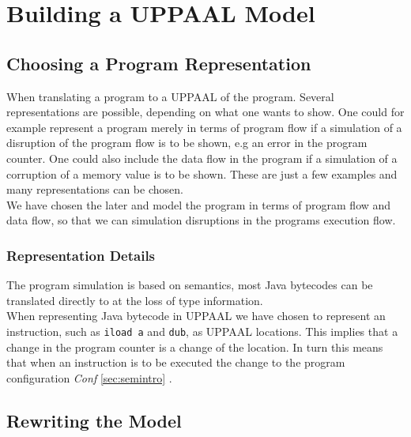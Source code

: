 \chapter{Building a UPPAAL Model}
\section{Choosing a Program Representation}
When translating a program to a UPPAAL of the program. Several representations are possible, depending on what one wants to show. One could for example represent a program merely in terms of program flow if a simulation of a disruption of the program flow is to be shown, e.g an error in the program counter. One could also include the data flow in the program if a simulation of a corruption of a memory value is to be shown. These are just a few examples and many representations can be chosen.\\

We have chosen the later and model the program in terms of program flow and data flow, so that we can simulation disruptions in the programs execution flow. 


\subsection{Representation Details}
The program simulation is based on \jcl semantics, most Java bytecodes can be translated directly to \jcl at the loss of type information.\\

When representing Java bytecode in UPPAAL we have chosen to represent an instruction, such as \texttt{iload a} and \texttt{dub}, as UPPAAL locations. This implies that a change in the program counter is a change of the location. In turn this means that when an instruction is to be executed the change to the program configuration \textit{Conf} \cref{sec:semintro} .

\section{Rewriting the Model}